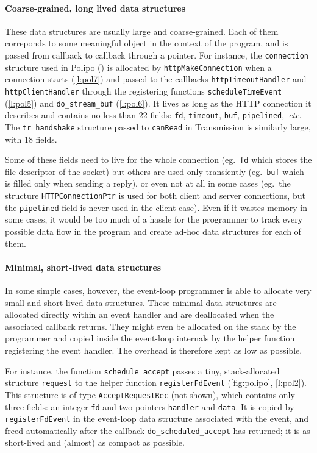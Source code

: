 \documentclass[a4paper]{llncs}
\begin{document}
\paragraph{Coarse-grained, long lived data structures}

These data structures are usually large and coarse-grained.  Each of them
correponds to
some meaningful object in the context of the program, and is passed from
callback to callback through a pointer.  For instance, the \texttt{connection}
structure used in Polipo () is allocated by
\texttt{httpMakeConnection} when a connection starts (\cref{l:pol7}) and passed
to the callbacks \texttt{httpTimeoutHandler} and \texttt{httpClientHandler}
through the registering functions \texttt{scheduleTimeEvent} (\cref{l:pol5}) and
\texttt{do\_stream\_buf} (\cref{l:pol6}). It lives as long as the HTTP
connection it describes and contains no less than 22 fields: \texttt{fd},
\texttt{timeout}, \texttt{buf}, \texttt{pipelined},~\textit{etc}. The
\texttt{tr\_handshake} structure passed to \texttt{canRead} in Transmission is
similarly large, with 18 fields.

Some of these fields need to live for the whole connection (eg.\ \texttt{fd}
which stores the file descriptor of the socket) but others are used only
transiently (eg.\ \texttt{buf} which is filled only when sending a reply), or
even not at all in some cases (eg.\ the structure \texttt{HTTPConnectionPtr} is
used for both client and server connections, but the \texttt{pipelined} field is
never used in the client case).  Even if it wastes memory in some cases, it
would be too much of a hassle for the programmer to track every possible data
flow in the program and create ad-hoc data structures for each of them.

\paragraph{Minimal, short-lived data structures}

In some simple cases, however, the event-loop programmer is able to allocate
very small and short-lived data structures.  These minimal data structures are
allocated directly within an event handler and are deallocated when the
associated callback returns.  They might even be allocated on the stack by the
programmer and copied inside the event-loop internals by the helper function
registering the event handler.  The overhead is therefore kept as low as
possible.

For instance, the function \texttt{schedule\_accept} passes a tiny,
stack-allocated structure \texttt{request} to the helper function
\texttt{registerFdEvent} (\cref{fig:polipo}, \cref{l:pol2}).  This structure is
of type \texttt{AcceptRequestRec} (not shown), which contains only three fields:
an integer \texttt{fd} and two pointers \texttt{handler} and \texttt{data}.  It
is copied by \texttt{registerFdEvent} in the event-loop data structure
associated with the event, and freed automatically after the callback
\texttt{do\_\allowbreak scheduled\_\allowbreak accept} has returned; it is as
short-lived and (almost) as compact as possible.
\end{document}
